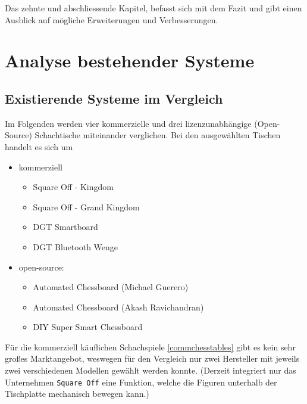 Das zehnte und abschliessende Kapitel, befasst sich mit dem Fazit und
gibt einen Ausblick auf mögliche Erweiterungen und Verbesserungen.

\hypertarget{analyse-bestehender-systeme}{%
\chapter{Analyse bestehender
Systeme}\label{analyse-bestehender-systeme}}

\hypertarget{existierende-systeme-im-vergleich}{%
\section{Existierende Systeme im
Vergleich}\label{existierende-systeme-im-vergleich}}

Im Folgenden werden vier kommerzielle und drei lizenzunabhängige
(Open-Source) Schachtische miteinander verglichen. Bei den ausgewählten
Tischen handelt es sich um

\begin{itemize}
\tightlist
\item
  kommerziell

  \begin{itemize}
  \tightlist
  \item
    Square Off - Kingdom
  \item
    Square Off - Grand Kingdom
  \item
    DGT Smartboard
  \item
    DGT Bluetooth Wenge
  \end{itemize}
\item
  open-source:

  \begin{itemize}
  \tightlist
  \item
    Automated Chessboard (Michael Guerero)
  \item
    Automated Chessboard (Akash Ravichandran)
  \item
    DIY Super Smart Chessboard
  \end{itemize}
\end{itemize}

Für die kommerziell käuflichen Schachspiele \ref{commchesstables} gibt
es kein sehr großes Marktangebot, weswegen für den Vergleich nur zwei
Hersteller mit jeweils zwei verschiedenen Modellen gewählt werden
konnte. (Derzeit integriert nur das Unternehmen
\passthrough{\lstinline!Square Off!} eine Funktion, welche die Figuren
unterhalb der Tischplatte mechanisch bewegen kann.)

